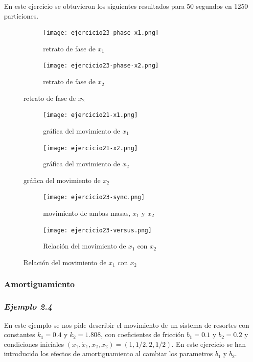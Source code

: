 \documentclass{article}
\begin{document}
En este ejercicio se obtuvieron los siguientes resultados para 50 segundos en 1250 particiones.

\begin{figure}[h!]
	\begin{subfigure}[b]{0.5\linewidth}
    \raggedleft
	\texttt{[image: ejercicio23-phase-x1.png]}
    \caption{retrato de fase de $x_1$}
	\end{subfigure}
	\begin{subfigure}[b]{0.5\linewidth}
    \raggedright
	\texttt{[image: ejercicio23-phase-x2.png]}
	\caption{retrato de fase de $x_2$}
    \end{subfigure}
\end{figure}

\begin{figure}[ht!]
	\begin{subfigure}[b]{0.5\linewidth}
    \raggedleft
	\texttt{[image: ejercicio21-x1.png]}
    \caption{gráfica del movimiento de $x_1$}
	\end{subfigure}
	\begin{subfigure}[b]{0.5\linewidth}
    \raggedright
	\texttt{[image: ejercicio21-x2.png]}
	\caption{gráfica del movimiento de $x_2$}
    \end{subfigure}
\end{figure}

\begin{figure}[ht!]
	\begin{subfigure}[b]{0.5\linewidth}
    \raggedleft
	\texttt{[image: ejercicio23-sync.png]}
    \caption{movimiento de ambas masas, $x_1$ y $x_2$}
	\end{subfigure}
	\begin{subfigure}[b]{0.5\linewidth}
    \raggedright
	\texttt{[image: ejercicio23-versus.png]}
	\caption{Relación del movimiento de $x_1$ con $x_2$}
    \end{subfigure}
\end{figure}

\newpage

\subsubsection{Amortiguamiento}

\subsubsection*{\textit{Ejemplo 2.4}}

En este ejemplo se nos pide describir el movimiento de un sistema de resortes con constantes $k_1=0.4$ y $k_2=1.808$, con coeficientes de fricción $b_1=0.1$ y $b_2=0.2$ y condiciones iniciales $(x_1,\dot{x}_1,x_2,\dot{x}_2)=(1,1/2,2,1/2)$. En este ejercicio se han introducido los efectos de amortiguamiento al cambiar los parametros $b_1$ y $b_2$.
\end{document}
